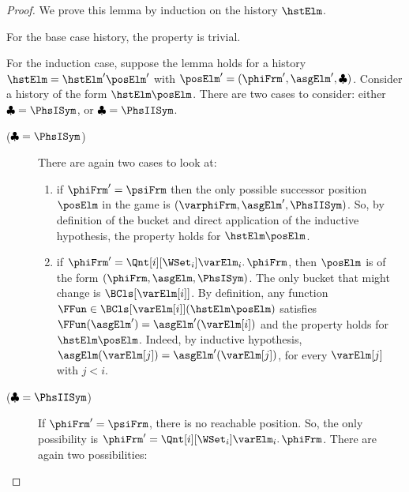 \documentclass[authoryear]{elsarticle}
\begin{document}
\begin{proof}
  We prove this lemma by induction on the history $\hstElm$.

  For the base case history, the property is trivial.

  For the induction case, suppose the lemma holds for a history $\hstElm =
  \hstElm' \posElm'$ with $\posElm' = (\phiFrm', \asgElm', \clubsuit)$. Consider
  a history of the form $\hstElm \posElm$. There are two cases to consider:
  either $\clubsuit= \PhsISym$, or $\clubsuit = \PhsIISym$.
\begin{description}
  \item[($\clubsuit= \PhsISym$)] There are again two cases to look at:
   \begin{enumerate}
   \item if $\phiFrm' = \psiFrm$ then the only
     possible successor position $\posElm$ in the game is $(\varphiFrm,
     \asgElm', \PhsIISym)$. So, by definition of the bucket and direct
     application of the inductive hypothesis, the property holds for $\hstElm
     \posElm$.
    \item if $\phiFrm' = \Qnt[i][\WSet_i] \varElm_i \ldotp \phiFrm$, then
      $\posElm$ is of the form $(\phiFrm, \asgElm, \PhsISym)$.  The only bucket
      that might change is $\BCls[{\varElm[{i}]}]$.  By definition, any function
      $\FFun \in \BCls[{\varElm[{i}]}](\hstElm \posElm)$ satisfies
      $\FFun(\asgElm') = \asgElm'(\varElm[i])$ and the property holds for
      $\hstElm \posElm$. Indeed, by inductive hypothesis, $\asgElm(\varElm[j])
      = \asgElm'(\varElm[j])$, for every $\varElm[j]$ with $j<i$.
    \end{enumerate}
 \item[($\clubsuit= \PhsIISym$)] If $\phiFrm' = \psiFrm$, there is no reachable
   position. So, the only possibility is $\phiFrm' = \Qnt[i][\WSet_i]
   \varElm_i \ldotp \phiFrm$. There are again two possibilities:
\end{description}
\end{proof}
\end{document}
